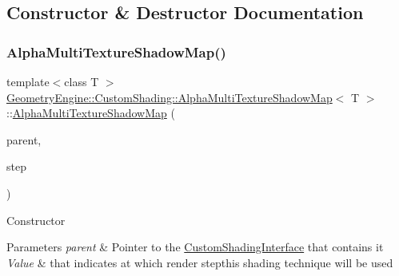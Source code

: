 \subsection{Constructor \& Destructor Documentation}
\mbox{\label{class_geometry_engine_1_1_custom_shading_1_1_alpha_multi_texture_shadow_map_aa6616681ccdc61e9ad0e8996a80c0f1e}} 
\subsubsection{\texorpdfstring{AlphaMultiTextureShadowMap()}{AlphaMultiTextureShadowMap()}\hspace{0.1cm}{\footnotesize\ttfamily [1/2]}}
{\footnotesize\ttfamily template$<$class T $>$ \\
\mbox{\hyperlink{class_geometry_engine_1_1_custom_shading_1_1_alpha_multi_texture_shadow_map}{Geometry\+Engine\+::\+Custom\+Shading\+::\+Alpha\+Multi\+Texture\+Shadow\+Map}}$<$ T $>$\+::\mbox{\hyperlink{class_geometry_engine_1_1_custom_shading_1_1_alpha_multi_texture_shadow_map}{Alpha\+Multi\+Texture\+Shadow\+Map}} (\begin{DoxyParamCaption}\item[{\mbox{\hyperlink{class_geometry_engine_1_1_custom_shading_1_1_custom_shading_interface}{Custom\+Shading\+Interface}} $\ast$}]{parent,  }\item[{\mbox{\hyperlink{namespace_geometry_engine_1_1_custom_shading_a2dc236a5b567da5099069ce2b2be5609}{Custom\+Shading\+Steps}}}]{step }\end{DoxyParamCaption})\hspace{0.3cm}{\ttfamily [inline]}}

Constructor 
\begin{DoxyParams}{Parameters}
{\em parent} & Pointer to the \mbox{\hyperlink{class_geometry_engine_1_1_custom_shading_1_1_custom_shading_interface}{Custom\+Shading\+Interface}} that contains it \\
\hline
{\em Value} & that indicates at which render stepthis shading technique will be used \\
\hline
\end{DoxyParams}
\mbox{\label{class_geometry_engine_1_1_custom_shading_1_1_alpha_multi_texture_shadow_map_ab099c9b9c3aab8ef5e2448b9aebe0f78}} 

